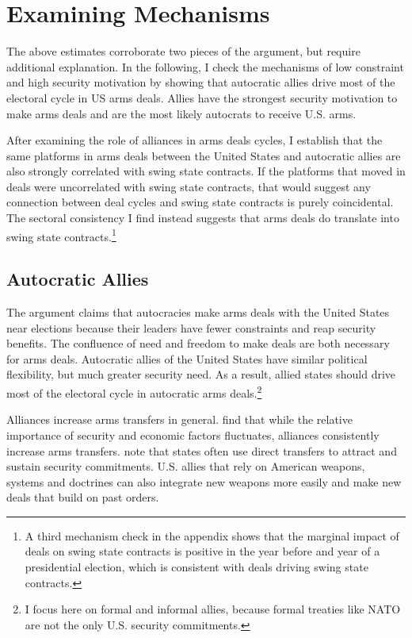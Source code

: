 \documentclass[12pt]{article}
\begin{document}
\section{Examining Mechanisms}


The above estimates corroborate two pieces of the argument, but require additional explanation. 
In the following, I check the mechanisms of low constraint and high security motivation by showing that autocratic allies drive most of the electoral cycle in US arms deals.  
Allies have the strongest security motivation to make arms deals and are the most likely autocrats to receive U.S. arms. 

After examining the role of alliances in arms deals cycles, I establish that the same platforms in arms deals between the United States and autocratic allies are also strongly correlated with swing state contracts.
If the platforms that moved in deals were uncorrelated with swing state contracts, that would suggest any connection between deal cycles and swing state contracts is purely coincidental.
The sectoral consistency I find instead suggests that arms deals do translate into swing state contracts.\footnote{A third mechanism check in the appendix shows that the marginal impact of deals on swing state contracts is positive in the year before and year of a presidential election, which is consistent with deals driving swing state contracts.}



\subsection{Autocratic Allies}


The argument claims that autocracies make arms deals with the United States near elections because their leaders have fewer constraints and reap security benefits. 
The confluence of need and freedom to make deals are both necessary for arms deals. 
Autocratic allies of the United States have similar political flexibility, but much greater security need. 
As a result, allied states should drive most of the electoral cycle in autocratic arms deals.\footnote{I focus here on formal and informal allies, because formal treaties like NATO are not the only U.S. security commitments.}


Alliances increase arms transfers in general. 
\citet{Thurneretal2019} find that while the relative importance of security and economic factors fluctuates, alliances consistently increase arms transfers.
\citet[pg. 184-5]{IkenberryGrieco2003} note that states often use direct transfers to attract and sustain security commitments. 
U.S. allies that rely on American weapons, systems and doctrines can also integrate new weapons more easily and make new deals that build on past orders. 
\end{document}
